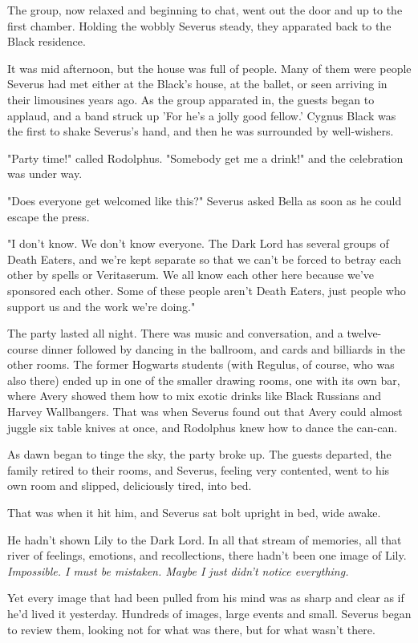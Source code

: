 \documentclass[a4paper,11pt]{article}
\begin{document}
The group, now relaxed and beginning to chat, went out the door and up to the first chamber. Holding the wobbly Severus steady, they apparated back to the Black residence.

It was mid afternoon, but the house was full of people. Many of them were people Severus had met either at the Black's house, at the ballet, or seen arriving in their limousines years ago. As the group apparated in, the guests began to applaud, and a band struck up 'For he's a jolly good fellow.' Cygnus Black was the first to shake Severus's hand, and then he was surrounded by well-wishers.

"Party time!" called Rodolphus. "Somebody get me a drink!" and the celebration was under way.

"Does everyone get welcomed like this?" Severus asked Bella as soon as he could escape the press.

"I don't know. We don't know everyone. The Dark Lord has several groups of Death Eaters, and we're kept separate so that we can't be forced to betray each other by spells or Veritaserum. We all know each other here because we've sponsored each other. Some of these people aren't Death Eaters, just people who support us and the work we're doing."

The party lasted all night. There was music and conversation, and a twelve-course dinner followed by dancing in the ballroom, and cards and billiards in the other rooms. The former Hogwarts students (with Regulus, of course, who was also there) ended up in one of the smaller drawing rooms, one with its own bar, where Avery showed them how to mix exotic drinks like Black Russians and Harvey Wallbangers. That was when Severus found out that Avery could almost juggle six table knives at once, and Rodolphus knew how to dance the can-can.

As dawn began to tinge the sky, the party broke up. The guests departed, the family retired to their rooms, and Severus, feeling very contented, went to his own room and slipped, deliciously tired, into bed.

That was when it hit him, and Severus sat bolt upright in bed, wide awake.

He hadn't shown Lily to the Dark Lord. In all that stream of memories, all that river of feelings, emotions, and recollections, there hadn't been one image of Lily. \emph{Impossible. I must be mistaken. Maybe I just didn't notice everything.}

Yet every image that had been pulled from his mind was as sharp and clear as if he'd lived it yesterday. Hundreds of images, large events and small. Severus began to review them, looking not for what was there, but for what wasn't there.
\end{document}
